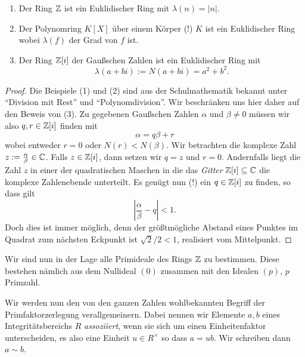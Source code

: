 \documentclass{book}
\begin{document}
\begin{prop}
    \label{prop:euklid}
    \begin{enumerate}
        \item {}Der Ring $\mathbb{Z}$ ist ein Euklidischer Ring mit $\lambda(n) = |n|$.
        \item {}Der Polynomring $K[X]$ über einem Körper (!) $K$ ist ein
            Euklidischer Ring wobei $\lambda(f)$ der Grad von $f$ ist. 
        \item {}Der Ring $\mathbb{Z}[i]$ der Gaußschen Zahlen ist ein Euklidischer Ring mit
            \[
                \lambda(a + bi) := N(a+bi) = a^2 + b^2.
            \]
    \end{enumerate}
\end{prop}
\begin{proof}
    Die Beispiele (1) und (2) sind aus der Schulmathematik bekannt unter
    ``Division mit Rest'' und ``Polynomdivision''. Wir beschränken uns hier
    daher auf den Beweis von (3). Zu gegebenen Gaußschen Zahlen $\alpha$ und
    $\beta \neq 0$ müssen wir also $q,r \in \mathbb{Z}[i]$ finden mit
    \[
        \alpha = q \beta + r
    \]
    wobei entweder $r=0$ oder $N(r) < N(\beta)$. Wir betrachten die komplexe
    Zahl $z := \frac{\alpha}{\beta} \in \mathbb{C}$. Falls $z \in
    \mathbb{Z}[i]$, dann setzen wir $q = z$ und $r = 0$.
    Andernfalls liegt die Zahl $z$ in einer der quadratischen Maschen in die
    das \emph{Gitter} $\mathbb{Z}[i] \subseteq \mathbb{C}$ die komplexe Zahlenebende
    unterteilt. Es genügt nun (!) ein $q \in \mathbb{Z}[i]$ zu finden, so dass gilt
    \begin{equation}
            |\frac{\alpha}{\beta} - q| < 1.
    \end{equation}
    Doch dies ist immer möglich, denn der größtmögliche Abstand eines Punktes
    im Quadrat zum nächsten Eckpunkt ist $\sqrt{2}/2 < 1$, realisiert vom Mittelpunkt. 
\end{proof}

\begin{exa}
    \label{exa:integers}
    Wir sind nun in der Lage alle Primideale des Rings $\mathbb{Z}$ zu bestimmen.
    Diese bestehen nämlich aus dem Nullideal $(0)$ zusammen mit den Idealen
    $(p)$, $p$ Primzahl. 
\end{exa}

Wir werden nun den von den ganzen Zahlen wohlbekannten Begriff der
Primfaktorzerlegung verallgemeinern. Dabei nennen wir Elemente $a,b$ eines
Integritätsbereichs $R$ \emph{assoziiert}, wenn sie sich um einen
Einheitenfaktor unterscheiden, es also eine Einheit $u \in R^{\times}$ so dass
$a = u b$. Wir schreiben dann $a \sim b$. 
\end{document}
